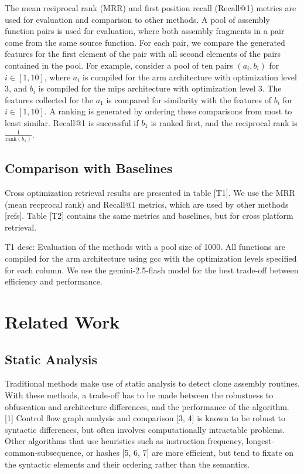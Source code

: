 \documentclass[conference,compsoc]{IEEEtran}
\begin{document}
The mean reciprocal rank (MRR) and first position recall (Recall@1) metrics are used for evaluation and comparison to other methods.
A pool of assembly function pairs is used for evaluation, where both assembly fragments in a pair come from the same source function.
For each pair, we compare the generated features for the first element of the pair with all second elements of the pairs contained
in the pool.  For example, consider a pool of ten pairs \((a_i, b_i)\) for \(i \in [1, 10]\), where \(a_i\) is compiled for the arm
architecture with optimization level 3, and \(b_i\) is compiled for the mips architecture with optimization
level 3. The features collected for the \(a_1\) is compared for similarity with the features of \(b_i\) for \(i \in [1, 10]\).
A ranking is generated by ordering these comparisons from most to least similar. Recall@1 is successful
if \(b_1\) is ranked first, and the reciprocal rank is \(\frac{1}{\text{rank}(b_1)}\).

\subsection{Comparison with Baselines}

Cross optimization retrieval results are presented in table [T1]. We use the MRR (mean recprocal rank) and Recall@1 metrics, which are used
by other methods [refs]. Table [T2] contains the same metrics and baselines, but for cross platform retrieval.

T1 desc: Evaluation of the methods with a pool size of 1000. All functions are compiled for the arm architecture using gcc with the
optimization levels specified for each column. We use the gemini-2.5-flash model for the best trade-off between efficiency and performance.

\section{Related Work}

\subsection{Static Analysis}

Traditional methods make use of static analysis to detect clone assembly routines. With these methods, a trade-off has
to be made between the robustness to obfuscation and architecture differences, and the performance of the algorithm. [1]
Control flow graph analysis and comparison [3, 4] is known to be robust to syntactic differences, but often involves computationally intractable
problems. Other algorithms that use heuristics such as instruction frequency, longest-common-subsequence, or hashes [5, 6, 7] are more
efficient, but tend to fixate on the syntactic elements and their ordering rather than the semantics.
\end{document}
